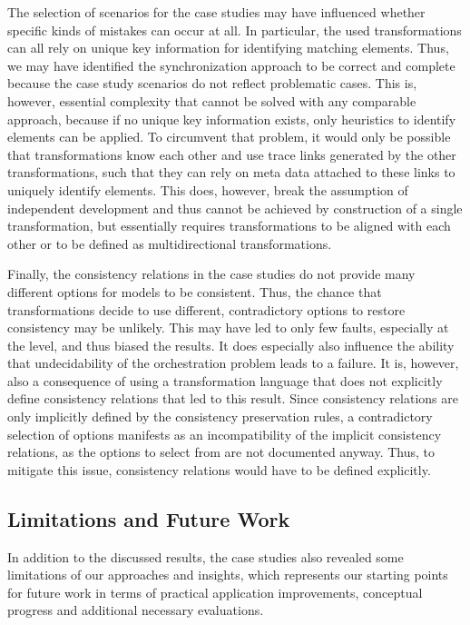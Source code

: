 The selection of scenarios for the case studies may have influenced whether specific kinds of mistakes can occur at all.
In particular, the used transformations can all rely on unique key information for identifying matching elements.
Thus, we may have identified the synchronization approach to be correct and complete because the case study scenarios do not reflect problematic cases.
This is, however, essential complexity that cannot be solved with any comparable approach, because if no unique key information exists, only heuristics to identify elements can be applied.
To circumvent that problem, it would only be possible that transformations know each other and use trace links generated by the other transformations, such that they can rely on meta data attached to these links to uniquely identify elements.
This does, however, break the assumption of independent development and thus cannot be achieved by construction of a single transformation, but essentially requires transformations to be aligned with each other or to be defined as multidirectional transformations.

Finally, the consistency relations in the case studies do not provide many different options for models to be consistent.
Thus, the chance that transformations decide to use different, contradictory options to restore consistency may be unlikely.
This may have led to only few faults, especially at the \levelnetworkrule level, and thus biased the results.
It does especially also influence the ability that undecidability of the orchestration problem leads to a failure.
It is, however, also a consequence of using a transformation language that does not explicitly define consistency relations that led to this result.
Since consistency relations are only implicitly defined by the consistency preservation rules, a contradictory selection of options manifests as an incompatibility of the implicit consistency relations, as the options to select from are not documented anyway.
Thus, to mitigate this issue, consistency relations would have to be defined explicitly.


\subsection{Limitations and Future Work}
\label{chap:correctness_evaluation:categorization:limitations}

In addition to the discussed results, the case studies also revealed some limitations of our approaches and insights, which represents our starting points for future work in terms of practical application improvements, conceptual progress and additional necessary evaluations.

